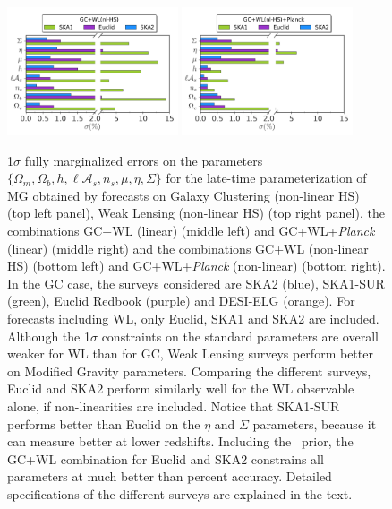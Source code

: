 \begin{figure}[htbp]
\begin{centering}
\includegraphics[width=0.45\textwidth]{Chapters/linear-nonlinear-MG-forecasts/figures/BarPlots/4surveys-GC+WLnlHS-MGDE-latetime}\hspace{-0.5pt}
\includegraphics[width=0.45\textwidth]{Chapters/linear-nonlinear-MG-forecasts/figures/BarPlots/4surveys-GC+WLnlHS+Planck-MGDE-latetime}
\par\end{centering}
\caption[Comparison of 1$\sigma$ errors on cosmological parameters for GC, WL and Planck for future surveys in the late-time parametrization.]{\label{fig:BarPlot-DE-GC-1}1$\sigma$ fully marginalized errors
on the parameters $\{\Omega_{m},\Omega_{b},h,\ell\mathcal{A}_{s},n_{s},\mu,\eta,\Sigma\}$ 
for the late-time parameterization of MG obtained by forecasts on
Galaxy Clustering (non-linear HS) (top left panel), Weak Lensing (non-linear HS) (top right panel), the 
combinations GC+WL (linear) (middle left) and GC+WL+{\it Planck} (linear) (middle right) and
the combinations GC+WL (non-linear HS) (bottom left) and GC+WL+{\it Planck} (non-linear) (bottom right).
In the GC case, the surveys
considered are SKA2 (blue), SKA1-SUR (green), Euclid Redbook (purple) and DESI-ELG (orange). For forecasts including WL, only Euclid, SKA1 and SKA2 are included.
Although the 1$\sigma$ constraints on the standard parameters are overall weaker for WL than for GC, Weak Lensing surveys perform better on Modified Gravity parameters. Comparing the different surveys,
Euclid and SKA2 perform similarly well for the WL observable alone, if non-linearities are included.
Notice that SKA1-SUR performs better than Euclid on the $\eta$ and $\Sigma$ parameters, because it can measure better at lower redshifts.
Including the \planck\ prior, the GC+WL combination for Euclid and SKA2 constrains all parameters at much better than percent accuracy. 
Detailed specifications of the different surveys are explained in the text.
}
\end{figure}

